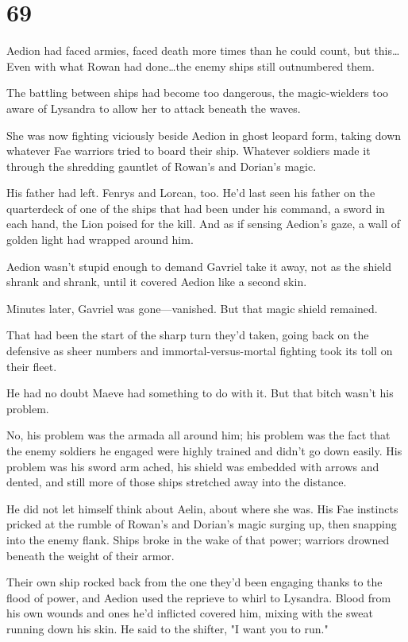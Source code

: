 
\chapter{69}

Aedion had faced armies, faced death more times than he could count, but this\ldots Even with what Rowan had done\ldots the enemy ships still outnumbered them.

The battling between ships had become too dangerous, the magic-wielders too aware of Lysandra to allow her to attack beneath the waves.

She was now fighting viciously beside Aedion in ghost leopard form, taking down whatever Fae warriors tried to board their ship.
Whatever soldiers made it through the shredding gauntlet of Rowan's and Dorian's magic.

His father had left.
Fenrys and Lorcan, too.
He'd last seen his father on the quarterdeck of one of the ships that had been under his command, a sword in each hand, the Lion poised for the kill.
And as if sensing Aedion's gaze, a wall of golden light had wrapped around him.

Aedion wasn't stupid enough to demand Gavriel take it away, not as the shield shrank and shrank, until it covered Aedion like a second skin.

Minutes later, Gavriel was gone---vanished.
But that magic shield remained.

That had been the start of the sharp turn they'd taken, going back on the defensive as sheer numbers and immortal-versus-mortal fighting took its toll on their fleet.

He had no doubt Maeve had something to do with it.
But that bitch wasn't his problem.

No, his problem was the armada all around him; his problem was the fact that the enemy soldiers he engaged were highly trained and didn't go down easily.
His problem was his sword arm ached, his shield was embedded with arrows and dented, and still more of those ships stretched away into the distance.

He did not let himself think about Aelin, about where she was.
His Fae instincts pricked at the rumble of Rowan's and Dorian's magic surging up, then snapping into the enemy flank.
Ships broke in the wake of that power; warriors drowned beneath the weight of their armor.

Their own ship rocked back from the one they'd been engaging thanks to the flood of power, and Aedion used the reprieve to whirl to Lysandra.
Blood from his own wounds and ones he'd inflicted covered him, mixing with the sweat running down his skin.
He said to the shifter, "I want you to run."

